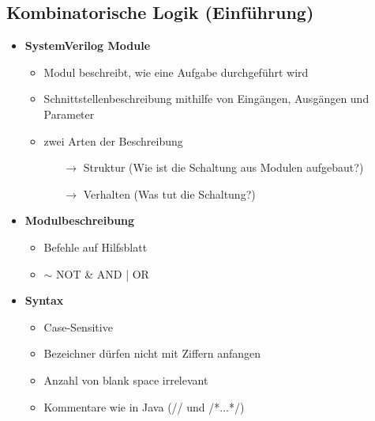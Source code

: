 \subsection{Kombinatorische Logik (Einführung)}
\begin{itemize}

\item \textbf{SystemVerilog Module}
	\begin{itemize}
	\item Modul beschreibt, wie eine Aufgabe durchgeführt wird
	\item Schnittstellenbeschreibung mithilfe von Eingängen, Ausgängen und Parameter
	\item zwei Arten der Beschreibung
	\begin{itemize}
	\item[$\rightarrow$] Struktur (Wie ist die Schaltung aus Modulen aufgebaut?)
		\item[$\rightarrow$] Verhalten (Was tut die Schaltung?)
	\end{itemize}
		
	\end{itemize}
	
\item \textbf{Modulbeschreibung}
	\begin{itemize}
	\item Befehle auf Hilfsblatt
	\item $\sim$ NOT   \& AND   | OR
	\end{itemize}
	
\item \textbf{Syntax}
	\begin{itemize}
	\item Case-Sensitive
	\item Bezeichner dürfen nicht mit Ziffern anfangen
	\item Anzahl von blank space irrelevant
	\item Kommentare wie in Java (// und /*...*/)
	\end{itemize}

\end{itemize}

